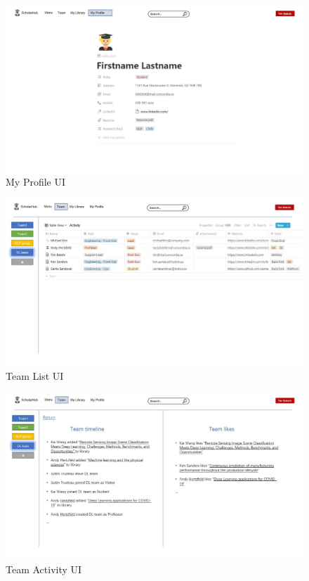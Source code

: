 \documentclass[]{scrreprt}
\begin{document}
\begin{figure}[htp]
	\centering
	\includegraphics[width=\textwidth]{./section/appendix/img/UI my profile.jpg}
	\caption{My Profile UI}
	\label{my profile UI}
\end{figure}

\begin{figure}[htp]
	\centering
	\includegraphics[width=\textwidth]{./section/appendix/img/UI teamlist.jpg}
	\caption{Team List UI}
	\label{teamlist UI}
\end{figure}

\begin{figure}[htp]
	\centering
	\includegraphics[width=\textwidth]{./section/appendix/img/UITeamactivity.jpg}
	\caption{Team Activity UI}
	\label{Teamactivity UI}
\end{figure}

\end{document}
